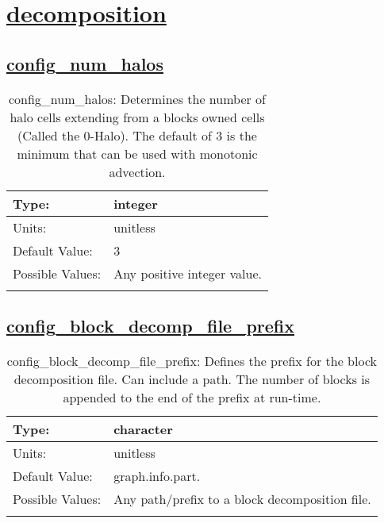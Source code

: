 \section[decomposition]{\hyperref[sec:nm_tab_decomposition]{decomposition}}
\label{sec:nm_sec_decomposition}
\subsection[config\_num\_halos]{\hyperref[sec:nm_tab_decomposition]{config\_num\_halos}}
\label{subsec:nm_sec_config_num_halos}
\begin{center}
\begin{longtable}{| p{2.0in} || p{4.0in} |}
    \hline
    Type: & integer \\
    \hline
    Units: & \si{unitless} \\
    \hline
    Default Value: & 3 \\
    \hline
    Possible Values: & Any positive integer value. \\
    \hline
    \caption{config\_num\_halos: Determines the number of halo cells extending from a blocks owned cells (Called the 0-Halo). The default of 3 is the minimum that can be used with monotonic advection.}
\end{longtable}
\end{center}
\subsection[config\_block\_decomp\_file\_prefix]{\hyperref[sec:nm_tab_decomposition]{config\_block\_decomp\_file\_prefix}}
\label{subsec:nm_sec_config_block_decomp_file_prefix}
\begin{center}
\begin{longtable}{| p{2.0in} || p{4.0in} |}
    \hline
    Type: & character \\
    \hline
    Units: & \si{unitless} \\
    \hline
    Default Value: & graph.info.part. \\
    \hline
    Possible Values: & Any path/prefix to a block decomposition file. \\
    \hline
    \caption{config\_block\_decomp\_file\_prefix: Defines the prefix for the block decomposition file. Can include a path. The number of blocks is appended to the end of the prefix at run-time.}
\end{longtable}
\end{center}
